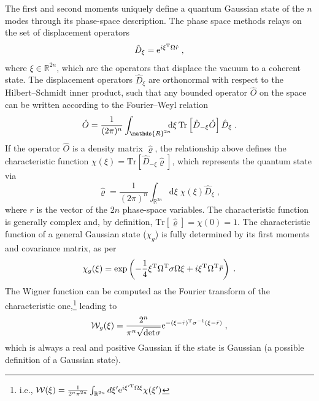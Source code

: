 \documentclass[%
reprint,
superscriptaddress,
nofootinbib,
 amsmath,amssymb,
prx,
floatfix,
]{revtex4-2}
\begin{document}
The first and second moments uniquely define a quantum Gaussian state of the $n$ modes through its phase-space description. The phase space methods relays on the set of displacement operators
\begin{equation}
    \hat{D}_{\xi} = {\rm e}^{i \xi^{\rm T} \Omega \hat{r}} \; , 
\end{equation}
where $\xi \in \mathds{R}^{2n}$, which are the operators that displace the vacuum to a coherent state. The displacement operators $\hat{D}_\xi$ are orthonormal with respect to the Hilbert--Schmidt inner product, such that any bounded operator $\hat{O}$ on the space can be written according to the Fourier–Weyl relation
\begin{equation}
    \hat{O} = \frac{1}{(2\pi)^n} \int_{\mathds{R}^{2n}} \hspace*{-0.2cm}\text{d} \xi\,  \text{Tr} \left[ \hat{D}_{-\xi} \hat{O} \right] \hat{D}_{\xi} \;. 
\end{equation}
If the operator $\hat{O}$ is a density matrix $\hat{\varrho}$, the relationship above defines the characteristic function $\chi(\xi) = \text{Tr} \left[ \hat{D}_{-\xi} \hat{\varrho} \right]$, which represents the quantum state via
\begin{equation}
    \hat{\varrho} =  \frac{1}{(2 \pi)^n} \int_{\mathds{R}^{2n}} \text{d} \xi  \; \chi (\xi) \hat{D}_{\xi} \;,
\end{equation}
where $r$ is the vector of the $2n$ phase-space variables. The characteristic function is generally complex and, by definition, $\text{Tr} [\hat{\varrho}] = \chi (0) = 1$. The characteristic function of a general Gaussian state ($\chi_g$) is fully determined by its first moments and covariance matrix, as per
\begin{equation}
\label{eq:chara_general_gaussian}
    \chi_g(\xi) = \exp \left( -\frac{1}{4} \xi^{\rm T} \Omega^{\rm T} \sigma   \Omega \xi + i \xi^{\rm T} \Omega^{\rm T} \bar{r} \right) \;.
\end{equation}
The Wigner function can be computed as the Fourier transform of the characteristic one,\footnote{i.e., $\mathcal{W}(\xi)= \frac{1}{2^n \pi^{2 n}} \int_{\mathbb{R}^{2 n}} d \xi' {\rm e}^{i \xi'^{\rm T} \Omega \xi} \chi (\xi')$} leading to 
\begin{equation}
\label{eq:wigner_general_gaussian}
    \mathcal{W}_g (\xi) = \frac{2^n}{\pi^n \sqrt{\text{det} \sigma }}{\rm e}^{-\left(\xi - \bar{r} \right)^{\rm T}  \sigma ^{-1} \left(\xi - \bar{r} \right)} \;,
\end{equation}
which is always a real and positive Gaussian if the state is Gaussian (a possible definition of a Gaussian state). 
\end{document}
